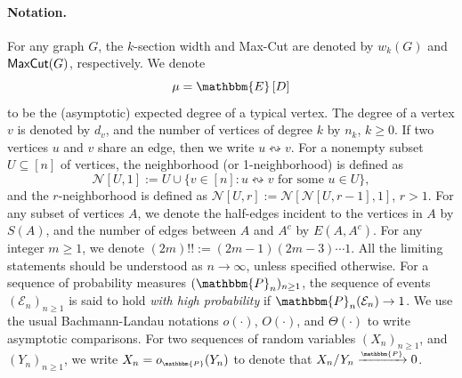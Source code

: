 \documentclass[11pt,a4paper, reqno]{article}
\numberwithin{equation}{section}
\numberwithin{equation}{section}
\def\sss{\scriptscriptstyle}
\newcommand{\expt}[1]{\ensuremath{\mathbbm{E}\left[#1\right]}}
\newcommand{\PR}{\ensuremath{\mathbbm{P}}}
\newcommand{\1}{\ensuremath{\mathbbm{1}}}
\newcommand{\oP}{\ensuremath{o_{\sss\PR}}}
\newcommand{\Mcut}{{\sf{MaxCut}}}
\numberwithin{equation}{section}
\numberwithin{theorem}{section}
\begin{document}
\paragraph{Notation.} 
For any graph $G$, the $k$-section width and Max-Cut are denoted by $w_k(G)$ and $\Mcut(G)$, respectively.
We denote 
$$
\mu=\expt{D}
$$
to be the (asymptotic) expected degree of a typical vertex.
The degree of a vertex $v$ is denoted by $d_v$, and 
the number of vertices of degree $k$ by $n_k$, $k\geq 0$.
If two vertices $u$ and $v$ share an edge, then we write $u\leftrightsquigarrow v$.
For a nonempty subset $U\subseteq [n]$ of vertices, the neighborhood (or 1-neighborhood) is defined as 
$$\mathcal{N}[U,1]:= U\cup \{v\in[n]:u\leftrightsquigarrow v\mbox{ for some }u\in U\},$$
and the $r$-neighborhood is defined as $\mathcal{N}[U,r]:=\mathcal{N}[\mathcal{N}[U,r-1],1]$, $r>1$.
For any subset of vertices $A$, we denote the half-edges incident to the vertices in $A$ by $S(A)$, and the number of edges between $A$ and $A^c$ by $E(A,A^c)$.
For any integer $m\geq 1$, we denote $(2m)!! := (2m-1)(2m-3)\cdots 1$.
All the limiting statements should be understood as $n\to\infty$, unless specified otherwise. 
For a sequence of probability measures $(\PR_n)_{n\geq 1}$, the sequence of events $(\mathcal{E}_n)_{n\geq 1}$ is said to hold \emph{with high probability} if $\PR_n(\mathcal{E}_n)\to 1$.
We use the usual Bachmann-Landau notations $o(\cdot)$, $O(\cdot)$, and $\Theta(\cdot)$ to write asymptotic comparisons.
For two sequences of random variables $(X_n)_{n\geq 1}$, and $(Y_n)_{n\geq 1}$, we write $X_n = \oP(Y_n)$ to denote that $X_n/Y_n\xrightarrow{\sss \PR} 0$.
\end{document}
